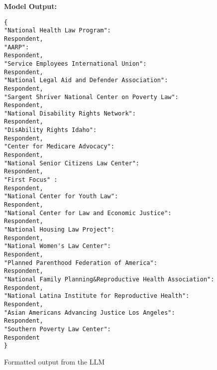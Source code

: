 \begin{figure}[H]
\centering
\textbf{Model Output:}\par\medskip
\begin{lstlisting}[]
{
"National Health Law Program": 
Respondent,
"AARP": 
Respondent,
"Service Employees International Union": 
Respondent,
"National Legal Aid and Defender Association": 
Respondent,
"Sargent Shriver National Center on Poverty Law": 
Respondent,
"National Disability Rights Network": 
Respondent,
"DisAbility Rights Idaho": 
Respondent,
"Center for Medicare Advocacy": 
Respondent,
"National Senior Citizens Law Center": 
Respondent,
"First Focus" : 
Respondent,
"National Center for Youth Law": 
Respondent,
"National Center for Law and Economic Justice": 
Respondent,
"National Housing Law Project": 
Respondent,
"National Women's Law Center": 
Respondent,
"Planned Parenthood Federation of America": 
Respondent,
"National Family Planning&Reproductive Health Association": 
Respondent,
"National Latina Institute for Reproductive Health": 
Respondent,
"Asian Americans Advancing Justice Los Angeles": 
Respondent,
"Southern Poverty Law Center": 
Respondent
}
\end{lstlisting}
\caption[Example Model Output \#1]{Formatted output from the LLM}
\end{figure}



